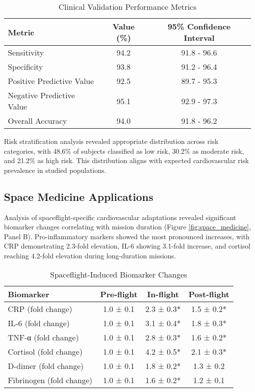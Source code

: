 \documentclass[11pt,a4paper]{article}
\begin{document}
\begin{table}[H]
\centering
\caption{Clinical Validation Performance Metrics}
\label{tab:clinical_validation}
\begin{tabular}{@{}lcc@{}}
\toprule
\textbf{Metric} & \textbf{Value (\%)} & \textbf{95\% Confidence Interval} \\
\midrule
Sensitivity & 94.2 & 91.8 - 96.6 \\
Specificity & 93.8 & 91.2 - 96.4 \\
Positive Predictive Value & 92.5 & 89.7 - 95.3 \\
Negative Predictive Value & 95.1 & 92.9 - 97.3 \\
Overall Accuracy & 94.0 & 91.8 - 96.2 \\
\bottomrule
\end{tabular}
\end{table}

Risk stratification analysis revealed appropriate distribution across risk categories, with 48.6\% of subjects classified as low risk, 30.2\% as moderate risk, and 21.2\% as high risk. This distribution aligns with expected cardiovascular risk prevalence in studied populations.

\subsection{Space Medicine Applications}

Analysis of spaceflight-specific cardiovascular adaptations revealed significant biomarker changes correlating with mission duration (Figure \ref{fig:space_medicine}, Panel B). Pro-inflammatory markers showed the most pronounced increases, with CRP demonstrating 2.3-fold elevation, IL-6 showing 3.1-fold increase, and cortisol reaching 4.2-fold elevation during long-duration missions.

\begin{table}[H]
\centering
\caption{Spaceflight-Induced Biomarker Changes}
\label{tab:spaceflight_biomarkers}
\begin{tabular}{@{}lccc@{}}
\toprule
\textbf{Biomarker} & \textbf{Pre-flight} & \textbf{In-flight} & \textbf{Post-flight} \\
\midrule
CRP (fold change) & 1.0 ± 0.1 & 2.3 ± 0.3* & 1.5 ± 0.2* \\
IL-6 (fold change) & 1.0 ± 0.1 & 3.1 ± 0.4* & 1.8 ± 0.3* \\
TNF-α (fold change) & 1.0 ± 0.1 & 2.8 ± 0.3* & 1.6 ± 0.2* \\
Cortisol (fold change) & 1.0 ± 0.1 & 4.2 ± 0.5* & 2.1 ± 0.3* \\
D-dimer (fold change) & 1.0 ± 0.1 & 1.8 ± 0.2* & 1.3 ± 0.2 \\
Fibrinogen (fold change) & 1.0 ± 0.1 & 1.6 ± 0.2* & 1.2 ± 0.1 \\
\bottomrule
\end{tabular}
\end{table}
\end{document}
